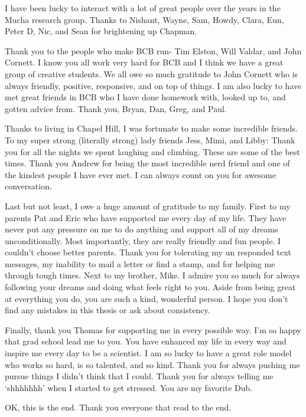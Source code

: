 I have been lucky to interact with a lot of great people over the years in the Mucha research group. Thanks to Nishant, Wayne, Sam, Howdy, Clara, Eun, Peter D, Nic, and Sean for brightening up Chapman.

Thank you to the people who make BCB run- Tim Elston, Will Valdar, and John Cornett. I know you all work very hard for BCB and I think we have a great group of creative students. We all owe so much gratitude to John Cornett who is always friendly, positive, responsive, and on top of things. I am also lucky to have met great friends in BCB who I have done homework with, looked up to, and gotten advice from. Thank you, Bryan, Dan, Greg, and Paul. 

Thanks to living in Chapel Hill, I was fortunate to make some incredible friends. To my super strong (literally strong) lady friends Jess, Mimi, and Libby: Thank you for all the nights we spent laughing and climbing. These are some of the best times. Thank you Andrew for being the most incredible nerd friend and one of the kindest people I have ever met. I can always count on you for awesome conversation. 

Last but not least, I owe a huge amount of gratitude to my family. First to my parents Pat and Eric who have supported me every day of my life. They have never put any pressure on me to do anything and support all of my dreams unconditionally. Most importantly, they are really friendly and fun people. I couldn't choose better parents. Thank you for tolerating my un responded text messages, my inability to mail a letter or find a stamp, and for helping me through tough times. Next to my brother, Mike. I admire you so much for always following your dreams and doing what feels right to you. Aside from being great at everything you do, you are such a kind, wonderful person. I hope you don't find any mistakes in this thesis or ask about consistency. 

Finally, thank you Thomas for supporting me in every possible way. I'm so happy that grad school lead me to you. You have enhanced my life in every way and inspire me every day to be a scientist. I am so lucky to have a great role model who works so hard, is so talented, and so kind. Thank you for always pushing me pursue things I didn't think that I could. Thank you for always telling me `shhhhhhh' when I started to get stressed. You are my favorite Dub.

OK, this is the end. Thank you everyone that read to the end.   

\clearpage
